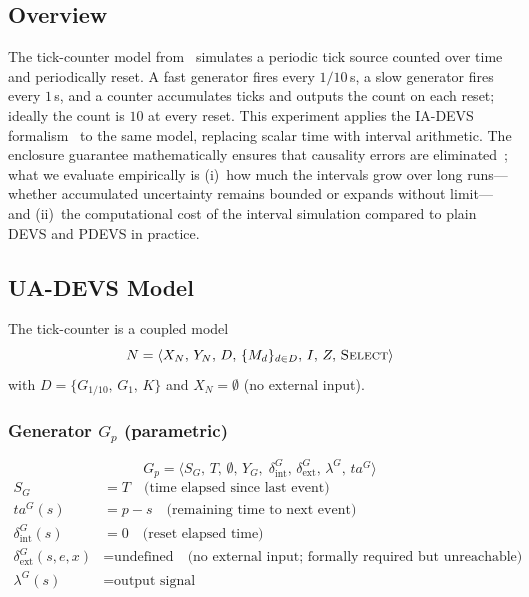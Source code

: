 \subsection*{Overview}

The tick-counter model from~\cite{VDW14} simulates a periodic tick source
counted over time and periodically reset.  A fast generator fires every
$1/10$\,s, a slow generator fires every $1$\,s, and a counter accumulates
ticks and outputs the count on each reset; ideally the count is $10$ at
every reset.  This experiment applies the IA-DEVS formalism~\cite{VDW21}
to the same model, replacing scalar time with interval arithmetic.
The enclosure guarantee mathematically ensures that causality errors are
eliminated~\cite{VDW21}; what we evaluate empirically is (i)~how much the
intervals grow over long runs---whether accumulated uncertainty remains bounded
or expands without limit---and (ii)~the computational cost of the interval
simulation compared to plain DEVS and PDEVS in practice.

\subsection*{UA-DEVS Model}

The tick-counter is a coupled model
\[
  N = \langle X_N,\, Y_N,\, D,\, \{M_d\}_{d \in D},\, I,\, Z,\, \textsc{Select} \rangle
\]
with $D = \{G_{1/10},\, G_1,\, K\}$ and $X_N = \emptyset$ (no external input).

\subsubsection*{Generator $G_p$ (parametric)}

\[
  G_p = \langle S_G,\, T,\, \emptyset,\, Y_G,\;
        \delta^G_{\text{int}},\, \delta^G_{\text{ext}},\,
        \lambda^G,\, ta^G \rangle
\]
\begin{align*}
  S_G &= T \quad\text{(time elapsed since last event)}\\
  ta^G(s) &= p - s \quad\text{(remaining time to next event)}\\
  \delta^G_{\text{int}}(s) &= 0 \quad\text{(reset elapsed time)}\\
  \delta^G_{\text{ext}}(s, e, x) &= \text{undefined} \quad
    \text{(no external input; formally required but unreachable)}\\
  \lambda^G(s) &= \text{output signal}
\end{align*}

